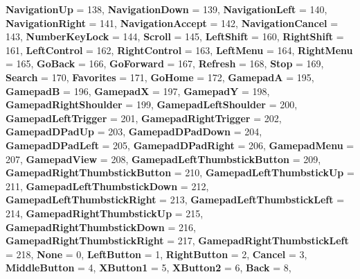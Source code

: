 \begin{DoxyCompactItemize}
{\bfseries Navigation\+Up} = 138, 
{\bfseries Navigation\+Down} = 139, 
{\bfseries Navigation\+Left} = 140, 
\newline
{\bfseries Navigation\+Right} = 141, 
{\bfseries Navigation\+Accept} = 142, 
{\bfseries Navigation\+Cancel} = 143, 
{\bfseries Number\+Key\+Lock} = 144, 
\newline
{\bfseries Scroll} = 145, 
{\bfseries Left\+Shift} = 160, 
{\bfseries Right\+Shift} = 161, 
{\bfseries Left\+Control} = 162, 
\newline
{\bfseries Right\+Control} = 163, 
{\bfseries Left\+Menu} = 164, 
{\bfseries Right\+Menu} = 165, 
{\bfseries Go\+Back} = 166, 
\newline
{\bfseries Go\+Forward} = 167, 
{\bfseries Refresh} = 168, 
{\bfseries Stop} = 169, 
{\bfseries Search} = 170, 
\newline
{\bfseries Favorites} = 171, 
{\bfseries Go\+Home} = 172, 
{\bfseries GamepadA} = 195, 
{\bfseries GamepadB} = 196, 
\newline
{\bfseries GamepadX} = 197, 
{\bfseries GamepadY} = 198, 
{\bfseries Gamepad\+Right\+Shoulder} = 199, 
{\bfseries Gamepad\+Left\+Shoulder} = 200, 
\newline
{\bfseries Gamepad\+Left\+Trigger} = 201, 
{\bfseries Gamepad\+Right\+Trigger} = 202, 
{\bfseries Gamepad\+D\+Pad\+Up} = 203, 
{\bfseries Gamepad\+D\+Pad\+Down} = 204, 
\newline
{\bfseries Gamepad\+D\+Pad\+Left} = 205, 
{\bfseries Gamepad\+D\+Pad\+Right} = 206, 
{\bfseries Gamepad\+Menu} = 207, 
{\bfseries Gamepad\+View} = 208, 
\newline
{\bfseries Gamepad\+Left\+Thumbstick\+Button} = 209, 
{\bfseries Gamepad\+Right\+Thumbstick\+Button} = 210, 
{\bfseries Gamepad\+Left\+Thumbstick\+Up} = 211, 
{\bfseries Gamepad\+Left\+Thumbstick\+Down} = 212, 
\newline
{\bfseries Gamepad\+Left\+Thumbstick\+Right} = 213, 
{\bfseries Gamepad\+Left\+Thumbstick\+Left} = 214, 
{\bfseries Gamepad\+Right\+Thumbstick\+Up} = 215, 
{\bfseries Gamepad\+Right\+Thumbstick\+Down} = 216, 
\newline
{\bfseries Gamepad\+Right\+Thumbstick\+Right} = 217, 
{\bfseries Gamepad\+Right\+Thumbstick\+Left} = 218, 
{\bfseries None} = 0, 
{\bfseries Left\+Button} = 1, 
\newline
{\bfseries Right\+Button} = 2, 
{\bfseries Cancel} = 3, 
{\bfseries Middle\+Button} = 4, 
{\bfseries X\+Button1} = 5, 
\newline
{\bfseries X\+Button2} = 6, 
{\bfseries Back} = 8, 

\end{DoxyCompactItemize}
